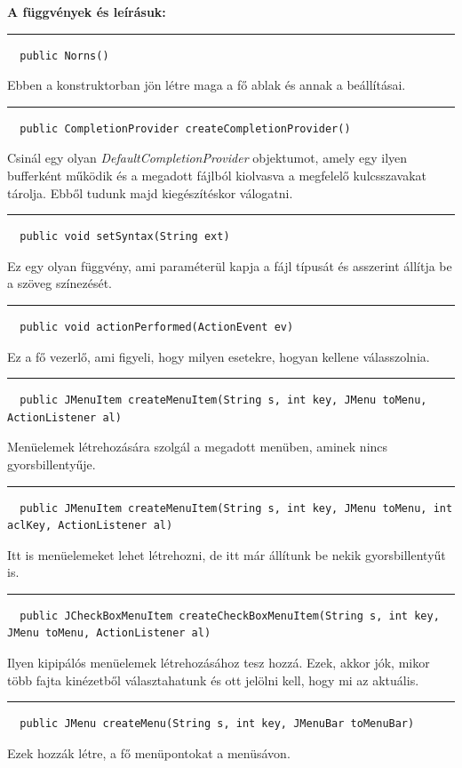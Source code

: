 \documentclass[12pt]{article}
\newcommand{\fuggveny}{\textbf{A függvények és leírásuk: \\}}
\newcommand{\vonal}{\noindent\rule{\textwidth}{1pt}}
\begin{document}
\newpage
\fuggveny
\vonal
\begin{lstlisting}
  public Norns()
\end{lstlisting}
Ebben a konstruktorban jön létre maga a fő ablak és annak a beállításai.

\vonal
\begin{lstlisting}
  public CompletionProvider createCompletionProvider()
\end{lstlisting}
Csinál egy olyan \textit{DefaultCompletionProvider} objektumot, amely egy ilyen
bufferként működik és a megadott fájlból kiolvasva a megfelelő kulcsszavakat tárolja.
Ebből tudunk majd kiegészítéskor válogatni.

\vonal
\begin{lstlisting}
  public void setSyntax(String ext)
\end{lstlisting}
Ez egy olyan függvény, ami paraméterül kapja a fájl típusát és asszerint állítja
be a szöveg színezését.

\vonal
\begin{lstlisting}
  public void actionPerformed(ActionEvent ev)
\end{lstlisting}
Ez a fő vezerlő, ami figyeli, hogy milyen esetekre, hogyan kellene válasszolnia.

\vonal
\begin{lstlisting}
  public JMenuItem createMenuItem(String s, int key, JMenu toMenu, ActionListener al)
\end{lstlisting}
Menüelemek létrehozására szolgál a megadott menüben, aminek nincs gyorsbillentyűje.

\vonal
\begin{lstlisting}
  public JMenuItem createMenuItem(String s, int key, JMenu toMenu, int aclKey, ActionListener al)
\end{lstlisting}
Itt is menüelemeket lehet létrehozni, de itt már állítunk be nekik gyorsbillentyűt
is.

\vonal
\begin{lstlisting}
  public JCheckBoxMenuItem createCheckBoxMenuItem(String s, int key, JMenu toMenu, ActionListener al)
\end{lstlisting}
Ilyen kipipálós menüelemek létrehozásához tesz hozzá. Ezek, akkor jók, mikor
több fajta kinézetből választahatunk és ott jelölni kell, hogy mi az aktuális.

\vonal
\begin{lstlisting}
  public JMenu createMenu(String s, int key, JMenuBar toMenuBar)
\end{lstlisting}
Ezek hozzák létre, a fő menüpontokat a menüsávon.
\end{document}
